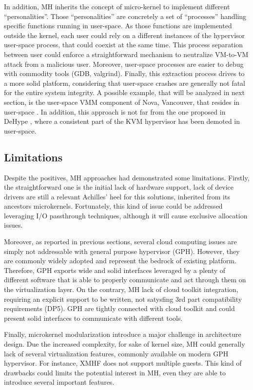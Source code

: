 \documentclass{sig-alternate}
\begin{document}
In addition, MH inherits the concept of micro-kernel to implement different ``personalities''. Those ``personalities'' are concretely a set of ``processes'' handling specific functions running in user-space. As those functions are implemented outside the kernel, each user could rely on a different instances of the hypervisor user-space process, that could coexist at the same time. This process separation between user could enforce a straightforward mechanism to neutralize VM-to-VM attack from a malicious user. Moreover, user-space processes are easier to debug with commodity tools (GDB, valgrind).
Finally, this extraction process drives to a more solid platform, considering that user-space crashes are generally not fatal for the entire system integrity.  A possible example, that will be analyzed in next section, is the user-space VMM component of Nova, Vancouver, that resides in user-space \cite{nova}.
In addition, this approach is not far from the one proposed in DeHype \cite{wu2013TamHosHypMosDepExe}, where a consistent part of the KVM hypervisor has been demoted in user-space.

\subsection{Limitations}

\noindent Despite the positives, MH approaches had demonstrated some limitations. Firstly, the straightforward one is the initial lack of hardware support, lack of device drivers are still a relevant Achilles' heel for this solutions, inherited from its ancestors microkernels. Fortunately, this kind of issue could be addressed leveraging I/O passthrough techniques, although it will cause exclusive allocation issues.

Moreover, as reported in previous sections, several cloud computing issues are simply not addressable with general purpose hypervisor (GPH). However, they are commonly widely adopted and represent the bedrock of existing platform. Therefore, GPH exports wide and solid interfaces leveraged by a plenty of different software that is able to properly communicate and act through them on the virtualization layer. On the contrary, MH lack of cloud toolkit integration, requiring an explicit support to be written, not satysfing 3rd part compatibility requirements (DP5). GPH are tightly connected with cloud toolkit and could present solid interfaces to communicate with different tools. 

Finally, microkernel modularization introduce a major challenge in architecture design. Due the increased complexity, for sake of kernel size, MH could generally lack of several virtualization features, commonly available on modern GPH hypervisor. For instance, XMHF does not support multiple guests. This kind of drawbacks could limits the potential interest in MH, even they are able to introduce several important features.
\end{document}
